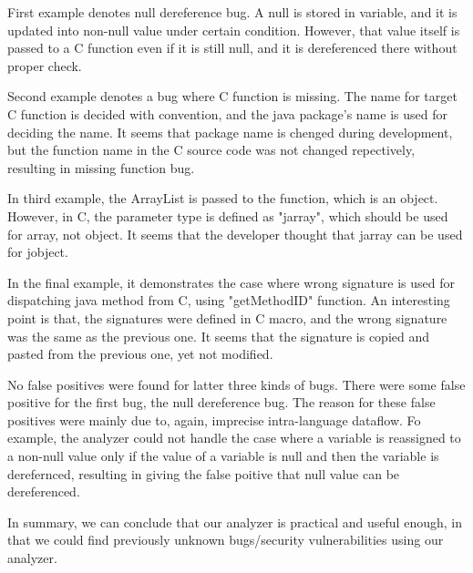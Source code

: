 First example denotes null dereference bug. A null is stored in variable, and
it is updated into non-null value under certain condition. However, that value
itself is passed to a C function even if it is still null, and it is dereferenced there
without proper check.

Second example denotes a bug where C function is missing. The name for target C
function is decided with convention, and the java package's name is used
for deciding the name. It seems that package name is chenged during development,
but the function name in the C source code was not changed repectively, resulting
in missing function bug.

In third example, the ArrayList is passed to the function, which is an object.
However, in C, the parameter type is defined as "jarray", which should be used
for array, not object. It seems that the developer thought that jarray can be
used for jobject.

In the final example, it demonstrates the case where wrong signature is used
for dispatching java method from C, using "getMethodID" function. An interesting
point is that, the signatures were defined in C macro, and the wrong signature
was the same as the previous one. It seems that the signature is copied and pasted
from the previous one, yet not modified.

No false positives were found for latter three kinds of bugs.  There were some
false positive for the first bug, the null dereference bug. The reason for
these false positives were mainly due to, again, imprecise intra-language
dataflow. Fo example, the analyzer could not handle the case where a variable
is reassigned to a non-null value only if the value of a variable is null and
then the variable is derefernced, resulting in giving the false poitive that
null value can be dereferenced.

In summary, we can conclude that our analyzer is practical and useful enough,
in that we could find previously unknown bugs/security vulnerabilities using
our analyzer.
